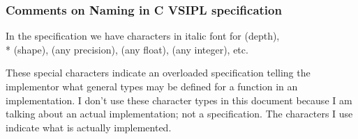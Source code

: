 \subsubsection*{Comments on Naming in C VSIPL specification}
In the \cvl{} specification we have characters in italic font for  (depth), \\*  (shape),  (any precision),  (any float),  (any integer), etc. 

These special characters indicate an overloaded specification telling the implementor what general types may be defined for a function in an implementation.   I don't use these character types in this document because I am talking about an actual implementation; not a specification.  The characters I use indicate what is actually implemented.
